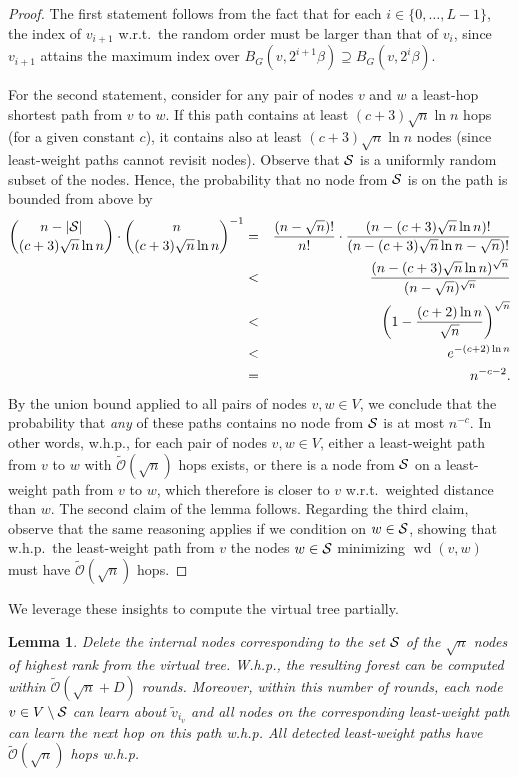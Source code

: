\documentclass[letterpaper,11pt]{article}
\newtheorem{lemma}[theorem]{Lemma}
\newcommand{\BO}{\mathcal{O}}
\DeclareMathOperator{\Wd}{wd}
\begin{document}
\begin{proof}
The first statement follows from the fact that for each $i\in \{0,\ldots,L-1\}$,
the index of $v_{i+1}$ w.r.t.\ the random order must be larger than that of
$v_i$, since $v_{i+1}$ attains the maximum index over
$B_G(v,2^{i+1}\beta )\supseteq B_G(v,2^i\beta )$.

For the second statement, consider for any pair of nodes $v$ and $w$ a
least-hop shortest path from $v$ to $w$. If this path contains at least
$(c+3)\sqrt{n}\ln n$ hops (for a given constant $c$), it contains also at least
$(c+3)\sqrt{n}\ln n$ nodes (since least-weight paths cannot revisit nodes).
Observe that ${\cal S}$ is a uniformly random subset of the nodes. Hence, the
probability that no node from ${\cal S}$ is on the path is bounded from above
by
\begin{eqnarray*}
\binom{n-|{\cal S}|}{(c+3)\sqrt{n}\ln n}\cdot \binom{n}{(c+3)\sqrt{n}\ln
n}^{-1}&=&\frac{(n-\sqrt{n})!}{n!}\cdot \frac{(n-(c+3)\sqrt{n}\ln
n)!}{(n-(c+3)\sqrt{n}\ln n-\sqrt{n})!}\\
&< & \frac{(n-(c+3)\sqrt{n}\ln
n)^{\sqrt{n}}}{(n-\sqrt{n})^{\sqrt{n}}}\\
&< & \left(1-\frac{(c+2)\ln n}{\sqrt{n}}\right)^{\sqrt{n}}\\
&<& e^{-(c+2)\ln n}\\
&=& n^{-c-2}.
\end{eqnarray*}
By the union bound applied to all pairs of nodes $v,w\in V$, we conclude that
the probability that \emph{any} of these paths contains no node from ${\cal S}$
is at most $n^{-c}$. In other words, w.h.p., for each pair of nodes $v,w\in
V$, either a least-weight path from $v$ to $w$ with
$\tilde{\BO}(\sqrt{n})$ hops exists, or there is a node from ${\cal S}$ on a
least-weight path from $v$ to $w$, which therefore is closer to $v$ w.r.t.\
weighted distance than $w$. The second claim of the lemma follows. Regarding
the third claim, observe that the same reasoning applies if we condition on
$w\in {\cal S}$, showing that w.h.p.\ the least-weight path from $v$ the nodes
$w\in {\cal S}$ minimizing $\Wd(v,w)$ must have $\tilde{\BO}(\sqrt{n})$ hops.
\end{proof}
We leverage these insights to compute the virtual tree partially.
\begin{lemma}\label{lemma:stage1_partial}
Delete the internal nodes corresponding to the set ${\cal S}$ of the $\sqrt{n}$
nodes of highest rank from the virtual tree. W.h.p., the resulting forest can be
computed within $\tilde{\BO}(\sqrt{n}+D)$ rounds. Moreover, within this number
of rounds, each node $v\in V\setminus {\cal S}$ can learn about
$\tilde{v}_{i_v}$ and all nodes on the corresponding least-weight path can learn
the next hop on this path w.h.p. All detected least-weight paths have
$\tilde{\BO}(\sqrt{n})$ hops w.h.p.
\end{lemma}
\end{document}
